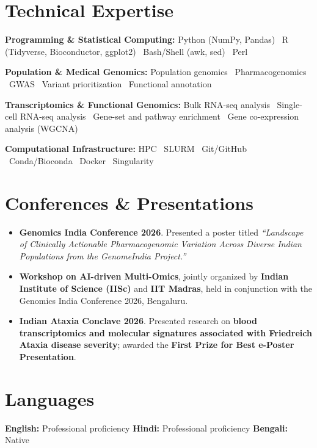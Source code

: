 \documentclass[10pt,a4paper]{article}
\newcommand{\skill}[2]{
    \noindent\textbf{#1:} #2\vspace{0.25em}\par
}
\begin{document}

\section{Technical Expertise}

\skill{Programming \& Statistical Computing}{Python (NumPy, Pandas) \textbullet\ R (Tidyverse, Bioconductor, ggplot2) \textbullet\ Bash/Shell (awk, sed) \textbullet\ Perl}
\skill{Population \& Medical Genomics}{Population genomics \textbullet\ Pharmacogenomics \textbullet\ GWAS \textbullet\ Variant prioritization \textbullet\ Functional annotation}
\skill{Transcriptomics \& Functional Genomics}{Bulk RNA-seq analysis \textbullet\ Single-cell RNA-seq analysis \textbullet\ Gene-set and pathway enrichment \textbullet\ Gene co-expression analysis (WGCNA)}
\skill{Computational Infrastructure}{HPC \textbullet\ SLURM \textbullet\ Git/GitHub \textbullet\ Conda/Bioconda \textbullet\ Docker \textbullet\ Singularity}


\section{Conferences \& Presentations}

\begin{itemize}
\item \textbf{Genomics India Conference 2026}. Presented a poster titled \textit{``Landscape of Clinically Actionable Pharmacogenomic Variation Across Diverse Indian Populations from the GenomeIndia Project.''}
\item \textbf{Workshop on AI-driven Multi-Omics}, jointly organized by \textbf{Indian Institute of Science (IISc)} and \textbf{IIT Madras}, held in conjunction with the Genomics India Conference 2026, Bengaluru.
\item \textbf{Indian Ataxia Conclave 2026}. Presented research on \textbf{blood transcriptomics and molecular signatures associated with Friedreich Ataxia disease severity}; awarded the \textbf{First Prize for Best e-Poster Presentation}.
\end{itemize}


\section{Languages}

\textbf{English:} Professional proficiency \quad \textbf{Hindi:} Professional proficiency \quad \textbf{Bengali:} Native
\end{document}
